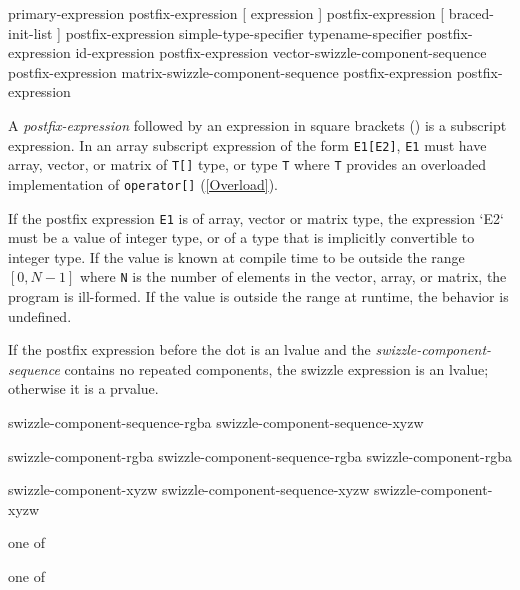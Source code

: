 
\begin{grammar}
  \br
  primary-expression\br
  postfix-expression [ expression ]\br
  postfix-expression [ braced-init-list ]\br %
  postfix-expression \terminal{(}  \terminal{)}\br
  simple-type-specifier \terminal{(}  \terminal{)}\br
  typename-specifier \terminal{(}  \terminal{)}\br
  postfix-expression   id-expression\br
  postfix-expression  vector-swizzle-component-sequence\br
  postfix-expression  matrix-swizzle-component-sequence\br
  postfix-expression \terminal{++}\br
  postfix-expression \terminal{--}
\end{grammar}


\p A \textit{postfix-expression} followed by an expression in square brackets
(\texttt{\lbrack \rbrack}) is a subscript expression. In an array subscript
expression of the form \texttt{E1[E2]}, \texttt{E1} must have array, vector, or
matrix of \texttt{T[]} type, or type \texttt{T} where \texttt{T} provides an
overloaded implementation of \texttt{operator[]} (\ref{Overload}).

\p If the postfix expression \texttt{E1} is of array, vector or matrix type, the
expression `E2` must be a value of integer type, or of a type that is
implicitly convertible to integer type. If the value is known at compile
time to be outside the range \([0, N-1]\) where \texttt{N} is the number of
elements in the vector, array, or matrix, the program is ill-formed. If the
value is outside the range at runtime, the behavior is undefined.


\p If the postfix expression before the dot is an lvalue and the
\textit{swizzle-component-sequence} contains no repeated components, the swizzle
expression is an lvalue; otherwise it is a prvalue.


\begin{grammar}
  \br
  swizzle-component-sequence-rgba\br
  swizzle-component-sequence-xyzw\br

  \br
  swizzle-component-rgba\br
  swizzle-component-sequence-rgba swizzle-component-rgba\br

  \br
  swizzle-component-xyzw\br
  swizzle-component-sequence-xyzw swizzle-component-xyzw\br

   \textnormal{one of}\br
  \br

   \textnormal{one of}\br
\end{grammar}


